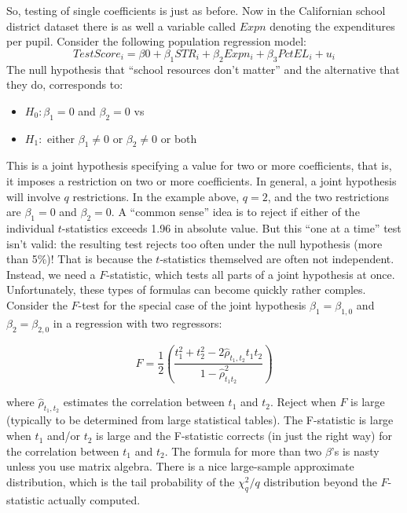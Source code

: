 \documentclass[
]{book}
\providecommand{\tightlist}{%
  \setlength{\itemsep}{0pt}\setlength{\parskip}{0pt}}
\begin{document}
So, testing of single coefficients is just as before. Now in the Californian school district dataset there is as well a variable called \(Expn\) denoting the expenditures per pupil. Consider the following population
regression model:
\begin{equation}
TestScore_i = \beta0 + \beta_1 STR_i + \beta_2 Expn_i + \beta_3PctEL_i + u_i
\end{equation}
The null hypothesis that ``school resources don't matter'' and the alternative that they do, corresponds to:

\begin{itemize}
\tightlist
\item
  \(H_0:\beta_1 =0\) and \(\beta_2 =0\) vs
\item
  \(H_1:\) either \(\beta_1 \neq 0\) or \(\beta_2 \neq 0\) or both
\end{itemize}

This is a joint hypothesis specifying a value for two or more coefficients, that is, it imposes a restriction on two or more coefficients. In general, a joint hypothesis will involve \(q\) restrictions. In the example above, \(q = 2\), and the two restrictions are \(\beta_1 = 0\) and \(\beta_2 = 0\). A ``common sense'' idea is to reject if either of the individual \(t\)-statistics exceeds 1.96 in absolute value. But this ``one at a time'' test isn't valid: the resulting test rejects too often under the null hypothesis (more than 5\%)! That is because the \(t\)-statistics themselved are often not independent. Instead, we need a \(F\)-statistic, which tests all parts of a joint hypothesis at once. Unfortunately, these types of formulas can become quickly rather comples. Consider the \(F\)-test for the special case of the joint hypothesis \(\beta_1 = \beta_{1,0}\) and \(\beta_2 = \beta_{2,0}\) in a regression with two regressors:

\begin{equation}
F = \frac{1}{2} \left(\frac{t_1^2 + t_2^2 - 2\hat{\rho}_{t_1,t_2}t_1 t_2}{1-\hat{\rho}^2_{t_1 t_2}}  \right)
\end{equation}

where \(\hat{\rho}_{t_1,t_2}\) estimates the correlation between \(t_1\) and \(t_2\). Reject when \(F\) is large (typically to be determined from large statistical tables). The F-statistic is large when \(t_1\) and/or \(t_2\) is large and the F-statistic corrects (in just the right way) for the correlation between \(t_1\) and \(t_2\). The formula for more than two \(\beta\)'s is nasty unless you use matrix algebra. There is a nice large-sample approximate distribution, which is the tail probability of the \(\chi^2_q /q\) distribution beyond the \(F\)-statistic actually computed.
\end{document}
